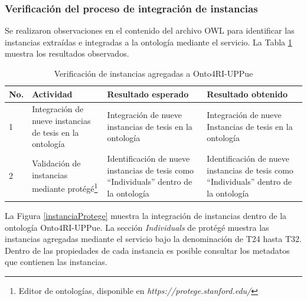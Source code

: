 \subsubsection{Verificaci\'on del proceso de integraci\'on de instancias}

Se realizaron observaciones en el contenido del archivo OWL para identificar las instancias extra\'idas e integradas a la ontolog\'ia mediante el servicio. La Tabla \ref{tablaEvaluacionProtege} muestra los resultados observados.

\begin{table}[htbp]
    \begin{center}
    \caption{Verificaci\'on de instancias agregadas a Onto4RI-UPPue}
    \begin{tabular}{| p{1.5cm}| p{3.5cm} | p{3.5cm} | p{3.5cm} |}
    \hline
    \centering \textbf{No. } & \textbf{Actividad} & \textbf{Resultado esperado} & \textbf{Resultado obtenido} \\
    \hline \hline
    1 & Integraci\'on de nueve instancias de tesis en la ontolog\'ia & Integraci\'on de nueve instancias de tesis en la ontolog\'ia & Integraci\'on de nueve
Instancias de tesis en la ontolog\'ia
  \\ \hline
    2 & Validaci\'on de instancias mediante prot\'eg\'e\footnote{Editor de ontolog\'ias, disponible en \textit{https://protege.stanford.edu/}} & Identificaci\'on de nueve instancias de tesis como “Individuals” dentro de la ontolog\'ia & Identificaci\'on de nueve instancias de tesis como “Individuals” dentro de la ontolog\'ia \\ \hline
    \end{tabular}
    \label{tablaEvaluacionProtege}
    \end{center}
\end{table}

La Figura \ref{instanciaProtege} muestra la integraci\'on de instancias dentro de la ontolog\'ia Onto4RI-UPPue. La secci\'on \textit{Individuals} de prot\'eg\'e muestra las instancias agregadas mediante el servicio bajo la denominaci\'on de T24 hasta T32. Dentro de las propiedades de cada instancia es posible consultar los metadatos que contienen las instancias.

